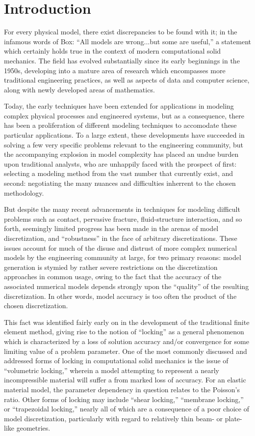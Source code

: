 \chapter{Introduction}
%
For every physical model, there exist discrepancies to be found with it; in the infamous words of Box: ``All models are wrong...but some are useful,'' a statement which certainly holds true in the context of modern computational solid mechanics. The field has evolved substantially since its early beginnings in the 1950s, developing into a mature area of research which encompasses more traditional engineering practices, as well as aspects of data and computer science, along with newly developed areas of mathematics.

Today, the early techniques have been extended for applications in modeling complex physical processes and engineered systems, but as a consequence, there has been a proliferation of different modeling techniques to accomodate these particular applications. To a large extent, these developments have succeeded in solving a few very specific problems relevant to the engineering community, but the accompanying explosion in model complexity has placed an undue burden upon traditional analysts, who are unhappily faced with the prospect of first: selecting a modeling method from the vast number that currently exist, and second: negotiating the many nuances and difficulties inherrent to the chosen methodology.

But despite the many recent advancements in techniques for modeling difficult problems such as contact, pervasive fracture, fluid-structure interaction, and so forth, seemingly limited progress has been made in the arenas of model discretization, and ``robustness'' in the face of arbitrary discretizations. These issues account for much of the disuse and distrust of more complex numerical models by the engineering community at large, for two primary reasons: model generation is stymied by rather severe restrictions on the discretization approaches in common usage, owing to the fact that the accuracy of the associated numerical models depends strongly upon the ``quality'' of the resulting discretization. In other words, model accuracy is too often the product of the chosen discretization.

This fact was identified fairly early on in the development of the traditional finite element method, giving rise to the notion of ``locking'' as a general phenomenon which is characterized by a loss of solution accuracy and/or convergence for some limiting value of a problem parameter. One of the most commonly discussed and addressed forms of locking in computational solid mechanics is the issue of ``volumetric locking,'' wherein a model attempting to represent a nearly incompressible material will suffer a from marked loss of accuracy. For an elastic material model, the parameter dependency in question relates to the Poisson's ratio. Other forms of locking may include ``shear locking,'' ``membrane locking,'' or ``trapezoidal locking,'' nearly all of which are a consequence of a poor choice of model discretization, particularly with regard to relatively thin beam- or plate-like geometries.

